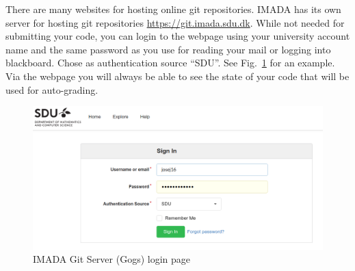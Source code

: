 There are many websites for hosting online git repositories. IMADA has its own server for hosting git repositories  \url{https://git.imada.sdu.dk}. While not needed for submitting your code, you can login to the webpage using your university account name and the same password as you use for reading your mail or logging into blackboard. Chose as authentication source ``SDU''. See Fig.~\ref{fig:gogs} for an example. Via the webpage you will always be able to see the state of your code that will be used for auto-grading.

\begin{figure}
  \includegraphics[width=\textwidth]{gogs}
  \caption{IMADA Git Server (Gogs) login page}
  \label{fig:gogs}
\end{figure}

